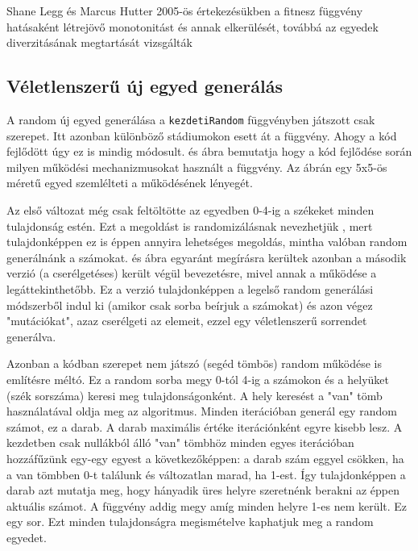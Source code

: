 \documentclass[12pt,a4paper,oneside]{report}
\begin{document}
Shane Legg és Marcus Hutter 2005-ös értekezésükben a fitnesz függvény hatásaként létrejövő monotonitást és annak elkerülését, továbbá az egyedek diverzitásának megtartását vizsgálták\cite{Legg:2005:FUD:1068009.1068216}


        
        \subsection{Véletlenszerű új egyed generálás} %
        
        A random új egyed generálása a \texttt{kezdetiRandom} függvényben játszott csak szerepet.
        Itt azonban különböző stádiumokon esett át a függvény. Ahogy a kód fejlődött úgy ez is mindig módosult.
         és  ábra bemutatja hogy a kód fejlődése során milyen működési mechanizmusokat használt a függvény.
        Az ábrán egy 5x5-ös méretű egyed szemlélteti a működésének lényegét.
        
        
        Az első változat még csak feltöltötte az egyedben 0-4-ig a székeket minden tulajdonság estén.
        Ezt a megoldást is randomizálásnak nevezhetjük , mert tulajdonképpen ez is éppen annyira lehetséges megoldás, mintha valóban random generálnánk a számokat.
         és  ábra egyaránt megírásra kerültek azonban a második verzió (a cserélgetéses) került végül bevezetésre, mivel annak a működése a legáttekinthetőbb.
        Ez a verzió tulajdonképpen a legelső random generálási módszerből indul ki (amikor csak sorba beírjuk a számokat) és azon végez "mutációkat", azaz cserélgeti az elemeit, ezzel egy véletlenszerű sorrendet generálva.
        
        
        Azonban a kódban szerepet nem játszó (segéd tömbös) random
        működése is említésre méltó.
        Ez a random sorba megy 0-tól 4-ig a számokon és a helyüket (szék sorszáma) keresi meg tulajdonságonként.
        A hely keresést a "van" tömb használatával oldja meg az algoritmus.
        Minden iterációban generál egy random számot, ez a darab.
        A darab maximális értéke iterációnként egyre kisebb lesz.
        A kezdetben csak nullákból álló "van" tömbhöz minden egyes iterációban hozzáfűzünk egy-egy egyest a következőképpen: a darab szám eggyel csökken, ha a van tömbben 0-t találunk és változatlan marad, ha 1-est.
        Így tulajdonképpen a darab azt mutatja meg, hogy hányadik üres helyre szeretnénk berakni az éppen aktuális számot.
        A függvény addig megy amíg minden helyre 1-es nem került.
        Ez egy sor.
        Ezt minden tulajdonságra megismételve kaphatjuk meg a random egyedet.
            
\end{document}
